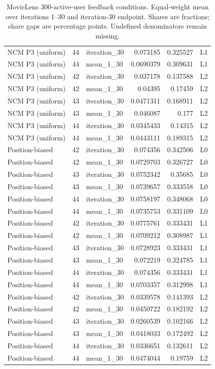 \begin{table}[htbp!]
\begin{tabular}{lrlrrl}
NCM P3 (uniform) & 44 & iteration\_30 & 0.073185 & 0.325527 & L1 \\
NCM P3 (uniform) & 44 & mean\_1\_30 & 0.0690379 & 0.309631 & L1 \\
NCM P3 (uniform) & 42 & iteration\_30 & 0.037178 & 0.137588 & L2 \\
NCM P3 (uniform) & 42 & mean\_1\_30 & 0.04395 & 0.17459 & L2 \\
NCM P3 (uniform) & 43 & iteration\_30 & 0.0471311 & 0.168911 & L2 \\
NCM P3 (uniform) & 43 & mean\_1\_30 & 0.046087 & 0.177 & L2 \\
NCM P3 (uniform) & 44 & iteration\_30 & 0.0345433 & 0.14315 & L2 \\
NCM P3 (uniform) & 44 & mean\_1\_30 & 0.0443111 & 0.189315 & L2 \\
Position-biased & 42 & iteration\_30 & 0.074356 & 0.342506 & L0 \\
Position-biased & 42 & mean\_1\_30 & 0.0729703 & 0.326727 & L0 \\
Position-biased & 43 & iteration\_30 & 0.0752342 & 0.35685 & L0 \\
Position-biased & 43 & mean\_1\_30 & 0.0739657 & 0.333558 & L0 \\
Position-biased & 44 & iteration\_30 & 0.0758197 & 0.348068 & L0 \\
Position-biased & 44 & mean\_1\_30 & 0.0735753 & 0.331109 & L0 \\
Position-biased & 42 & iteration\_30 & 0.0775761 & 0.333431 & L1 \\
Position-biased & 42 & mean\_1\_30 & 0.0709212 & 0.308987 & L1 \\
Position-biased & 43 & iteration\_30 & 0.0728923 & 0.333431 & L1 \\
Position-biased & 43 & mean\_1\_30 & 0.072219 & 0.324785 & L1 \\
Position-biased & 44 & iteration\_30 & 0.074356 & 0.333431 & L1 \\
Position-biased & 44 & mean\_1\_30 & 0.0703357 & 0.312998 & L1 \\
Position-biased & 42 & iteration\_30 & 0.0339578 & 0.141393 & L2 \\
Position-biased & 42 & mean\_1\_30 & 0.0450722 & 0.182192 & L2 \\
Position-biased & 43 & iteration\_30 & 0.0260539 & 0.102166 & L2 \\
Position-biased & 43 & mean\_1\_30 & 0.0418033 & 0.172492 & L2 \\
Position-biased & 44 & iteration\_30 & 0.0336651 & 0.132611 & L2 \\
Position-biased & 44 & mean\_1\_30 & 0.0474044 & 0.19759 & L2 \\
\hline
\end{tabular}
\caption{MovieLens 300-active-user feedback conditions. Equal-weight mean over iterations 1--30 and iteration-30 endpoint. Shares are fractions; share gaps are percentage points. Undefined denominators remain missing.}
\label{chap:results:tab:rq1_feedback_coverage}
\end{table}
